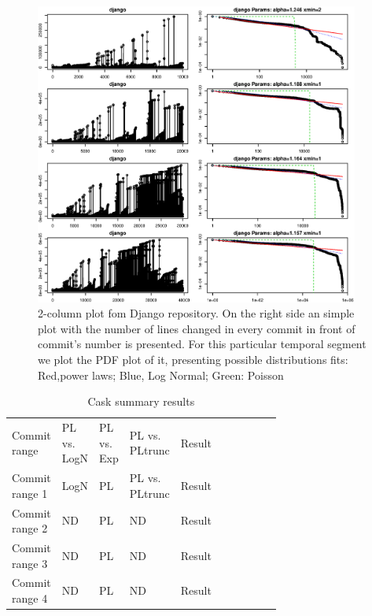 \documentclass[conference]{IEEEtran}
\begin{document}
\begin{figure}[htbp]
	\centerline{\includegraphics[width=0.95\textwidth]{img/django_global_set.eps}}
	\caption{2-column plot fom Django repository. On the right side an simple plot with the number of lines changed in every commit in front of commit's number is presented. For this particular temporal segment we plot the PDF plot of it, presenting possible distributions fits: Red,power laws; Blue, Log Normal; Green: Poisson }
	\label{fig:django}
\end{figure}


\begin{table}[h!tbp]
	\caption{Cask summary results}
	\begin{center}
		\begin{tabular}{| p{0.12\linewidth} | p{0.08\linewidth} | p{0.08\linewidth} | p{0.08\linewidth} | p{0.1\linewidth} |p{0.13\linewidth} | p{0.09\linewidth} |}
			\hline
                  Commit range & PL vs. LogN & PL vs. Exp & PL vs. PLtrunc & Result \\
                  Commit range 1 &  LogN & PL  & PL vs. PLtrunc & Result \\
                  Commit range 2& ND & PL  & ND & Result \\
                  Commit range 3& ND  &  PL & ND & Result \\
                  Commit range 4& ND & PL  & ND & Result \\
			\hline

			\hline
		\end{tabular}
	\end{center}
\label{tab:2019testscask}
\end{table}
\end{document}
